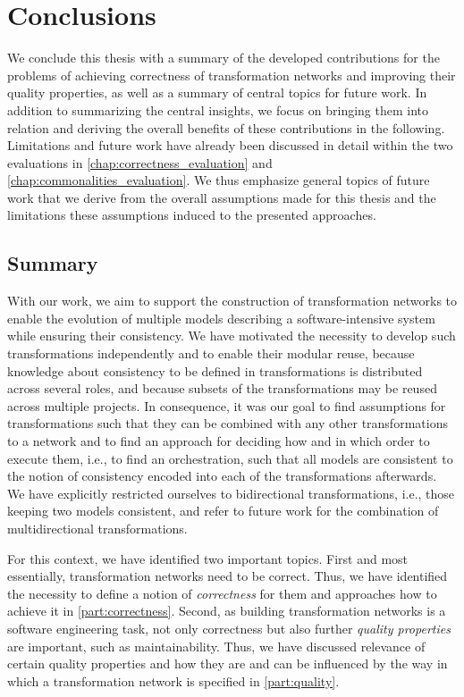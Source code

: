 \chapter{Conclusions
}
\label{chap:conclusions}

We conclude this thesis with a summary of the developed contributions for the problems of achieving correctness of transformation networks and improving their quality properties, as well as a summary of central topics for future work.
In addition to summarizing the central insights, we focus on bringing them into relation and deriving the overall benefits of these contributions in the following.
Limitations and future work have already been discussed in detail %
within the two evaluations in \autoref{chap:correctness_evaluation} and \autoref{chap:commonalities_evaluation}.
We thus emphasize general topics of future work that we derive from the overall assumptions made for this thesis and the limitations these assumptions induced to the presented approaches.


\section{Summary}

With our work, we aim to support the construction of transformation networks to enable the evolution of multiple models describing a software-intensive system while ensuring their consistency.
We have motivated the necessity to develop such transformations independently and to enable their modular reuse, because knowledge about consistency to be defined in transformations is distributed across several roles, and because subsets of the transformations may be reused across multiple projects.
In consequence, it was our goal to find assumptions for transformations such that they can be combined with any other transformations to a network and to find an approach for deciding how and in which order to execute them, i.e., to find an orchestration, such that all models are consistent to the notion of consistency encoded into each of the transformations afterwards.
We have explicitly restricted ourselves to bidirectional transformations, i.e., those keeping two models consistent, and refer to future work for the combination of multidirectional transformations.

For this context, we have identified two important topics.
First and most essentially, transformation networks need to be correct.
Thus, we have identified the necessity to define a notion of \emph{correctness} for them and approaches how to achieve it in \autoref{part:correctness}.
Second, as building transformation networks is a software engineering task, not only correctness but also further \emph{quality properties} are important, such as maintainability.
Thus, we have discussed relevance of certain quality properties and how they are and can be influenced by the way in which a transformation network is specified in \autoref{part:quality}.

